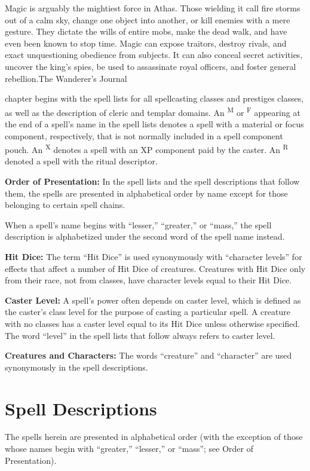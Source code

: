 {Magic is arguably the mightiest force in Athas. Those wielding it call fire storms out of a calm sky, change one object into another, or kill enemies with a mere gesture. They dictate the wills of entire mobs, make the dead walk, and have even been known to stop time. Magic can expose traitors, destroy rivals, and exact unquestioning obedience from subjects. It can also conceal secret activities, uncover the king's spies, be used to assassinate royal officers, and foster general rebellion.}{The Wanderer's Journal}

 chapter begins with the spell lists for all spellcasting classes and prestiges classes, as well as the description of cleric and templar domains. An \textsuperscript{M} or \textsuperscript{F} appearing at the end of a spell's name in the spell lists denotes a spell with a material or focus component, respectively, that is not normally included in a spell component pouch. An \textsuperscript{X} denotes a spell with an XP component paid by the caster. An \textsuperscript{R} denoted a spell with the ritual descriptor.

\textbf{Order of Presentation:} In the spell lists and the spell descriptions that follow them, the spells are presented in alphabetical order by name except for those belonging to certain spell chains.

When a spell's name begins with ``lesser,'' ``greater,'' or ``mass,'' the spell description is alphabetized under the second word of the spell name instead.

\textbf{Hit Dice:} The term ``Hit Dice'' is used synonymously with ``character levels'' for effects that affect a number of Hit Dice of creatures. Creatures with Hit Dice only from their race, not from classes, have character levels equal to their Hit Dice.

\textbf{Caster Level:} A spell's power often depends on caster level, which is defined as the caster's class level for the purpose of casting a particular spell. A creature with no classes has a caster level equal to its Hit Dice unless otherwise specified. The word ``level'' in the spell lists that follow always refers to caster level.

\textbf{Creatures and Characters:} The words ``creature'' and ``character'' are used synonymously in the spell descriptions.




\vskip3cm

% 





\clearpage
\section{Spell Descriptions}
The spells herein are presented in alphabetical order (with the exception of those whose names begin with ``greater,'' ``lesser,'' or ``mass''; see Order of Presentation).


